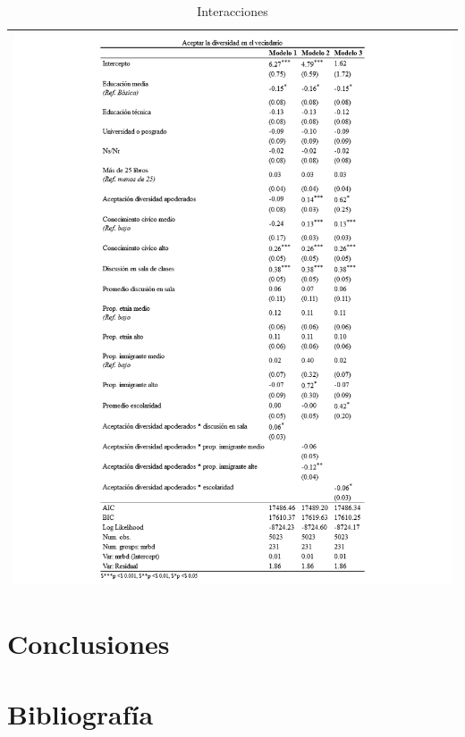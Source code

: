 \documentclass[12pt,twoside]{templates/facsothesis}
\begin{document}
\begin{longtable}[]{@{}l@{}}
\caption{\label{tab:interac}Interacciones}\tabularnewline
\toprule()
\endhead
\includegraphics{IPO/output/tables/interac.png} \\
\bottomrule()
\end{longtable}

\hypertarget{conclusiones}{%
\chapter{Conclusiones}\label{conclusiones}}

\hypertarget{bibliografuxeda}{%
\chapter*{Bibliografía}\label{bibliografuxeda}}



\end{document}
